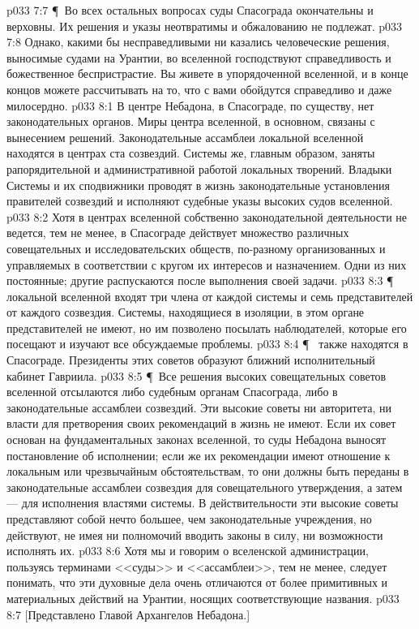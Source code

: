 \vs p033 7:7 \P\ Во всех остальных вопросах суды Спасограда окончательны и верховны. Их решения и указы неотвратимы и обжалованию не подлежат.
\vs p033 7:8 Однако, какими бы несправедливыми ни казались человеческие решения, выносимые судами на Урантии, во вселенной господствуют справедливость и божественное беспристрастие. Вы живете в упорядоченной вселенной, и в конце концов можете рассчитывать на то, что с вами обойдутся справедливо и даже милосердно.
\vs p033 8:1 В центре Небадона, в Спасограде, по существу, нет законодательных органов. Миры центра вселенной, в основном, связаны с вынесением решений. Законодательные ассамблеи локальной вселенной находятся в центрах ста созвездий. Системы же, главным образом, заняты рапорядительной и административной работой локальных творений. Владыки Системы и их сподвижники проводят в жизнь законодательные установления правителей созвездий и исполняют судебные указы высоких судов вселенной.
\vs p033 8:2 Хотя в центрах вселенной собственно законодательной деятельности не ведется, тем не менее, в Спасограде действует множество различных совещательных и исследовательских обществ, по\hyp{}разному организованных и управляемых в соответствии с кругом их интересов и назначением. Одни из них постоянные; другие распускаются после выполнения своей задачи.
\vs p033 8:3 \P\  локальной вселенной входят три члена от каждой системы и семь представителей от каждого созвездия. Системы, находящиеся в изоляции, в этом органе представителей не имеют, но им позволено посылать наблюдателей, которые его посещают и изучают все обсуждаемые проблемы.
\vs p033 8:4 \P\  также находятся в Спасограде. Президенты этих советов образуют ближний исполнительный кабинет Гавриила.
\vs p033 8:5 \P\ Все решения высоких совещательных советов вселенной отсылаются либо судебным органам Спасограда, либо в законодательные ассамблеи созвездий. Эти высокие советы ни авторитета, ни власти для претворения своих рекомендаций в жизнь не имеют. Если их совет основан на фундаментальных законах вселенной, то суды Небадона выносят постановление об исполнении; если же их рекомендации имеют отношение к локальным или чрезвычайным обстоятельствам, то они должны быть переданы в законодательные ассамблеи созвездия для совещательного утверждения, а затем --- для исполнения властями системы. В действительности эти высокие советы представляют собой нечто большее, чем законодательные учреждения, но действуют, не имея ни полномочий вводить законы в силу, ни возможности исполнять их.
\vs p033 8:6 Хотя мы и говорим о вселенской администрации, пользуясь терминами <<суды>> и <<ассамблеи>>, тем не менее, следует понимать, что эти духовные дела очень отличаются от более примитивных и материальных действий на Урантии, носящих соответствующие названия.
\vs p033 8:7 [Представлено Главой Архангелов Небадона.]
